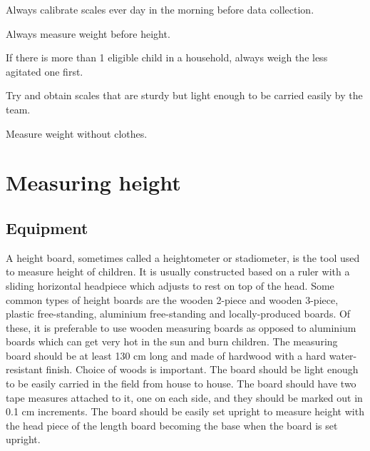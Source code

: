 \documentclass[12pt,]{book}
\theoremstyle{definition}
\theoremstyle{definition}
\theoremstyle{definition}
\theoremstyle{remark}
\let\BeginKnitrBlock\begin \let\EndKnitrBlock\end
\begin{document}
\BeginKnitrBlock{rmdremind}
\item 

Always calibrate scales ever day in the morning before data collection.

\item 

Always measure weight before height.

\item 

If there is more than 1 eligible child in a household, always weigh the
less agitated one first.

\item 

Try and obtain scales that are sturdy but light enough to be carried
easily by the team.

\item 

Measure weight without clothes.
\EndKnitrBlock{rmdremind}

\hypertarget{height}{%
\chapter{Measuring height}\label{height}}

\hypertarget{equipment-1}{%
\section{Equipment}\label{equipment-1}}

A height board, sometimes called a heightometer or stadiometer, is the
tool used to measure height of children. It is usually constructed based
on a ruler with a sliding horizontal headpiece which adjusts to rest on
top of the head. Some common types of height boards are the wooden
2-piece and wooden 3-piece, plastic free-standing, aluminium
free-standing and locally-produced boards. Of these, it is preferable to
use wooden measuring boards as opposed to aluminium boards which can get
very hot in the sun and burn children. The measuring board should be at
least 130 cm long and made of hardwood with a hard water-resistant
finish. Choice of woods is important. The board should be light enough
to be easily carried in the field from house to house. The board should
have two tape measures attached to it, one on each side, and they should
be marked out in 0.1 cm increments. The board should be easily set
upright to measure height with the head piece of the length board
becoming the base when the board is set upright.
\end{document}
